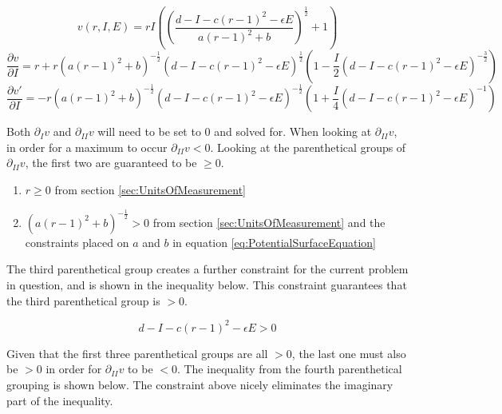 \begin{equation}
    \label{eq:SetsSubedInVolume}
    v(r,I,E)=rI\left( \left( \frac{d-I-c(r-1)^2-\epsilon E}{a(r-1)^2+b} \right)^\frac{1}{2} +1 \right)
\end{equation}
\begin{equation}
    \label{eq:VolumeIPartialDerivative}
    \frac{\partial v}{\partial I} = 
    r+
    r\left( a(r-1)^2+b \right)^{-\frac{1}{2}} 
    \left( d-I-c(r-1)^2-\epsilon E \right)^\frac{1}{2}
    \left(
        1-\frac{I}{2}\left( d-I-c(r-1)^2-\epsilon E \right)^{-\frac{3}{2}}
    \right)
\end{equation}
\begin{equation}
    \label{eq:VolumeISecondPartialDerivative}
    \frac{\partial v'}{\partial I}=
    -r\left( a(r-1)^2+b \right)^{-\frac{1}{2}}
    \left( d-I-c(r-1)^2-\epsilon E \right)^{-\frac{1}{2}}
    \left(
        1+\frac{I}{4}\left( d-I-c(r-1)^2-\epsilon E \right)^{-1}
    \right)
\end{equation}

Both $\partial_Iv$ and $\partial_{II}v$ will need to be set to $0$ and solved for. When looking at $\partial_{II}v$, in order for a maximum to occur $\partial_{II}v<0$. Looking at the parenthetical groups of $\partial_{II}v$, the first two are guaranteed to be $\ge 0$.

\begin{enumerate}
    \item $r\ge0$ from section \ref{sec:UnitsOfMeasurement}
    \item $\left( a(r-1)^2+b \right)^{-\frac{1}{2}}>0$ from section \ref{sec:UnitsOfMeasurement} and the constraints placed on $a$ and $b$ in equation \ref{eq:PotentialSurfaceEquation}
\end{enumerate}

The third parenthetical group creates a further constraint for the current problem in question, and is shown in the inequality below. This constraint guarantees that the third parenthetical group is $>0$.

\begin{equation*}
    d-I-c(r-1)^2-\epsilon E>0
\end{equation*}

Given that the first three parenthetical groups are all $>0$, the last one must also be $>0$ in order for $\partial_{II}v$ to be $<0$. The inequality from the fourth parenthetical grouping is shown below. The constraint above nicely eliminates the imaginary part of the inequality.

